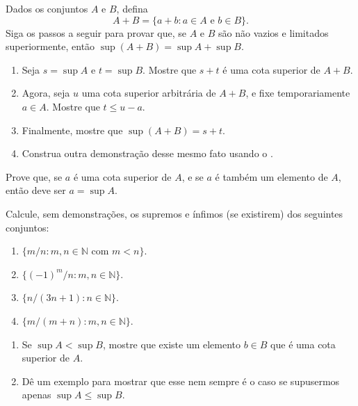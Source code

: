 \begin{exercise}\label{ex:sup-soma-conjuntos}
Dados os conjuntos $A$ e $B$, defina
\[
A + B = \{ a + b : a \in A \text{ e } b \in B \}.
\]
Siga os passos a seguir para provar que, se $A$ e $B$ são não vazios e limitados superiormente, então $\sup(A + B) = \sup A + \sup B$.
\begin{enumerate}[label=\alph*)]
\item Seja $s = \sup A$ e $t = \sup B$. Mostre que $s + t$ é uma cota superior de $A + B$.
\item Agora, seja $u$ uma cota superior arbitrária de $A + B$, e fixe temporariamente $a \in A$. Mostre que $t \leq u - a$.
\item Finalmente, mostre que $\sup(A + B) = s + t$.
\item Construa outra demonstração desse mesmo fato usando o .
\end{enumerate}
\end{exercise}

\begin{exercise}\label{ex:cota-superior-em-A}
Prove que, se $a$ é uma cota superior de $A$, e se $a$ é também um elemento de $A$, então deve ser $a = \sup A$.
\end{exercise}

\begin{exercise}\label{ex:calcular-sup-inf}
Calcule, sem demonstrações, os supremos e ínfimos (se existirem) dos seguintes conjuntos:
\begin{enumerate}[label=\alph*)]
\item $\{ m/n : m, n \in \mathbb{N} \text{ com } m < n \}$.
\item $\{ (-1)^{m}/n : m, n \in \mathbb{N} \}$.
\item $\{ n/(3n + 1) : n \in \mathbb{N} \}$.
\item $\{ m/(m + n) : m, n \in \mathbb{N} \}$.
\end{enumerate}
\end{exercise}

\begin{exercise}\label{ex:sup-A-menor-sup-B}
\begin{enumerate}[label=\alph*)]
\item Se $\sup A < \sup B$, mostre que existe um elemento $b \in B$ que é uma cota superior de $A$.
\item Dê um exemplo para mostrar que esse nem sempre é o caso se supusermos apenas $\sup A \leq \sup B$.
\end{enumerate}
\end{exercise}

